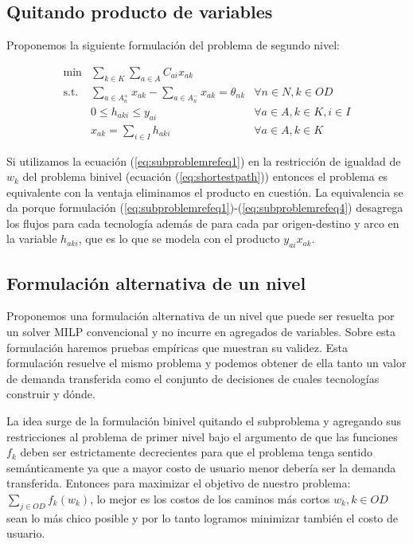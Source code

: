 \documentclass{article}
\begin{document}
  \subsection{Quitando producto de variables}
  \label{sect:variableproductremoval}

  Proponemos la siguiente formulación del problema de segundo nivel:

  \begin{align}
    \text{min}  & \sum_{k \in K} \sum_{a \in A} C_{ai} x_{ak}         & \label{eq:subproblemrefeq1} \\
    \text{s.t.} & \sum_{a \in A_n^+} x_{ak} - \sum_{a \in A_n^-} x_{ak} = \theta_{nk} & \forall n \in N, k \in OD \\
                & 0 \leq h_{aki} \leq y_{ai}                                          & \forall a \in A, k \in K, i \in I \\
                & x_{ak} = \sum_{i \in I} h_{aki}                                     & \forall a \in A, k \in K \label{eq:subproblemrefeq4}
  \end{align}

  Si utilizamos la ecuación (\ref{eq:subproblemrefeq1}) en la restricción de igualdad de $w_k$ del problema binivel (ecuación (\ref{eq:shortestpath})) entonces el problema es equivalente con la ventaja eliminamos el producto en cuestión. La equivalencia se da porque formulación (\ref{eq:subproblemrefeq1})-(\ref{eq:subproblemrefeq4}) desagrega los flujos para cada tecnología además de para cada par origen-destino y arco en la variable $h_{aki}$, que es lo que se modela con el producto $y_{ai} x_{ak}$.

  \subsection{Formulación alternativa de un nivel}
  \label{sect:singlelevelformulation}

  Proponemos una formulación alternativa de un nivel que puede ser resuelta por un solver MILP convencional y no incurre en agregados de variables. Sobre esta formulación haremos pruebas empíricas que muestran su validez. Esta formulación resuelve el mismo problema y podemos obtener de ella tanto un valor de demanda transferida como el conjunto de decisiones de cuales tecnologías construir y dónde.

  La idea surge de la formulación binivel quitando el subproblema y agregando sus restricciones al problema de primer nivel bajo el argumento de que las funciones $f_k$ deben ser estrictamente decrecientes para que el problema tenga sentido semánticamente ya que a mayor costo de usuario menor debería ser la demanda transferida. Entonces para maximizar el objetivo de nuestro problema: $\sum_{j \in OD}f_k(w_k)$, lo mejor es los costos de los caminos más cortos $w_k, k \in OD$ sean lo más chico posible y por lo tanto logramos minimizar también el costo de usuario.
\end{document}
